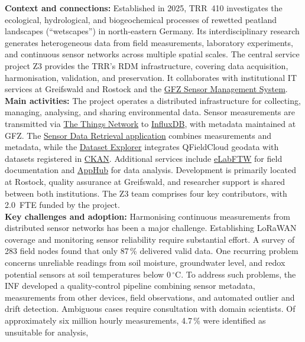\documentclass{eceasst}
\newcommand{\elabftw}{\href{https://www.elabftw.net/}{eLabFTW}}
\begin{document}
\noindent\textbf{Context and connections:}
Established in 2025, TRR~410 investigates the
ecological, hydrological, and biogeochemical
processes of rewetted peatland landscapes
(``wetscapes'') in north-eastern Germany.
Its interdisciplinary research generates
heterogeneous data from field measurements,
laboratory experiments, and continuous sensor
networks across multiple spatial scales.
The central service project Z3 provides the
TRR's RDM infrastructure, covering data acquisition,
harmonisation, validation, and preservation.
It collaborates with institutional IT services
at Greifswald and Rostock and the
\href{https://sensors.gfz.de/}{GFZ Sensor Management System}.
\\
\noindent\textbf{Main activities:}
The project operates a distributed infrastructure
for collecting, managing, analysing, and sharing
environmental data. Sensor measurements are
transmitted via
\href{https://eu1.cloud.thethings.network/}
{The Things Network} to
\href{https://www.influxdata.com/}{InfluxDB},
with metadata maintained at GFZ.
The \href{https://retrieval.wetscapes.uni-rostock.de/}
{Sensor Data Retrieval application}
combines measurements and metadata, while the
\href{https://explorer.wetscapes.uni-rostock.de/}
{Dataset Explorer} integrates QFieldCloud
geodata with datasets registered in
\href{https://ckan.fdm.uni-greifswald.de/}{CKAN}.
Additional services include \elabftw{}
for field documentation and
\href{https://apphub.wolke.uni-greifswald.de/}
{AppHub} for data analysis.
Development is primarily located at Rostock, quality assurance at Greifswald, and researcher support is shared between both institutions.
The Z3 team comprises four key contributors, with 2.0~FTE funded by the project.
\\
\noindent\textbf{Key challenges and adoption:}
Harmonising continuous measurements from distributed
sensor networks has been a major challenge.
Establishing LoRaWAN coverage and monitoring sensor
reliability require substantial effort.
A survey of 283 field nodes found that only
87\,\% delivered valid data.
One recurring problem concerns unreliable readings
from soil moisture, groundwater level, and redox
potential sensors at soil temperatures below
$0\,^\circ\mathrm{C}$. To address such problems,
the INF developed a quality-control pipeline
combining sensor metadata, measurements from other
devices, field observations, and automated outlier
and drift detection. Ambiguous cases require consultation with domain scientists.
Of approximately six million hourly measurements,
4.7\,\% were identified as unsuitable for analysis,
\end{document}
